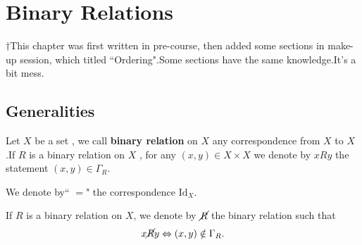 \chapter{Binary Relations }
$\dagger$This chapter was first written in pre-course,  then added some sections in make-up session, which titled ``Ordering".Some sections have the same knowledge.It's a bit mess.
\section{Generalities}
\begin{definitionenv}
    Let $X$ be a set , we call \textbf{binary relation} on $X$ any correspondence from $X$ to $X$ .If $R$ is a binary relation on $X$ , for any $(x, y)\in X\times X $ we denote by $x R y $ the statement $(x, y)\in \Gamma_R$.
\end{definitionenv}
\begin{exampleenv}
    We denote by`` $=$" the correspondence $\mathrm{Id}_X$.
\end{exampleenv}
\begin{definitionenv}
    If $R$ is a binary relation on $X$,  we denote by $\cancel{R} $ the binary relation such that $$x \cancel{R}  y \Leftrightarrow (x, y)\notin \Gamma_R.$$
\end{definitionenv}
